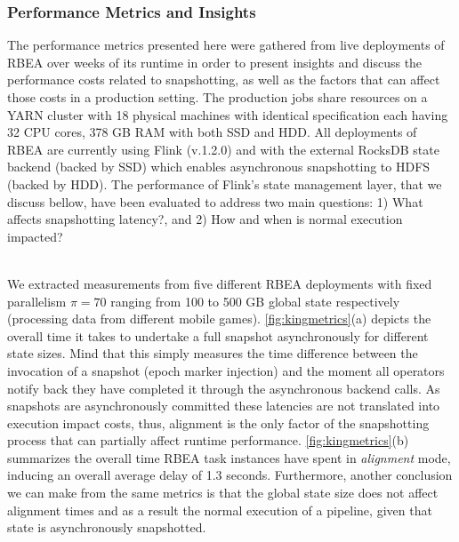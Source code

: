 \subsubsection{Performance Metrics and Insights} The performance metrics presented here were gathered from live deployments of RBEA over weeks of its runtime in order to present insights and discuss the performance costs related to snapshotting, as well as the factors that can affect those costs in a production setting. The production jobs share resources on a YARN cluster with 18 physical machines with identical specification each having 32 CPU cores, 378 GB RAM with both SSD and HDD. All deployments of RBEA are currently using Flink (v.1.2.0) and with the external RocksDB state backend (backed by SSD) which enables asynchronous snapshotting to HDFS (backed by HDD). The performance of Flink's state management layer, that we discuss bellow,  have been evaluated to address two main questions: 1) What affects  snapshotting latency?, and 2) How and when is normal execution impacted?

 \\
We extracted measurements from five different RBEA deployments with fixed parallelism $\pi = 70$ ranging from 100 to 500 GB global state respectively (processing data from different mobile games). \autoref{fig:kingmetrics}(a) depicts the overall time it takes to undertake a full snapshot asynchronously for different state sizes. Mind that this simply measures the time difference between the invocation of a snapshot (epoch marker injection) and the moment all operators notify back they have completed it through the asynchronous backend calls. As snapshots are asynchronously committed these latencies are not translated into execution impact costs, thus, alignment is the only factor of the snapshotting process that can partially affect runtime performance. \autoref{fig:kingmetrics}(b) summarizes the overall time RBEA task instances have spent in \emph{alignment} mode, inducing an overall average delay of 1.3 seconds. Furthermore, another conclusion we can make from the same metrics is that the global state size does not affect alignment times and as a result the normal execution of a pipeline, given that state is asynchronously snapshotted.

